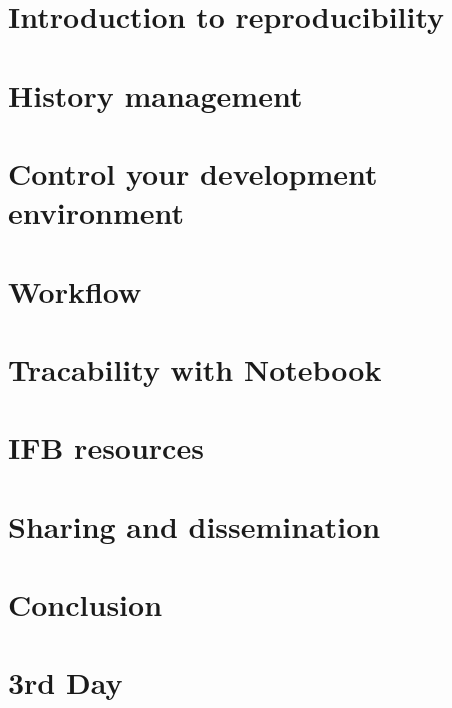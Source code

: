 \documentclass{beamer}
\begin{document}
\section[Introduction]{Introduction to reproducibility}

\label{History}
\section[History]{History management}

\label{Encapsulation}
\section[Encapsulation]{Control your development environment}

%
\label{Workflow}
\section[Pipeline]{Workflow}

\label{Notebooks}
\section{Tracability with Notebook}

\label{IFB}
\section[IFB]{IFB resources}

\label{Sharing}
\section{Sharing and dissemination}

\label{Conclusion}
\section{Conclusion}

\label{Brain storming}
\section{3rd Day}

\end{document}
